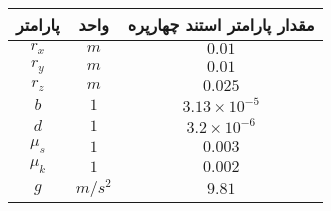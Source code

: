 \begin{table}[H]
	\begin{center}
		\begin{tabular}{ c c c }
			\hline
			پارامتر & واحد & مقدار پارامتر استند چهارپره    \\
			\hline
			
$r_{x}$ & $m$& $0.01$    \\
$r_{y}$ & $m$& $0.01$    \\
$r_{z}$ & $m$& $0.025$    \\
$b$ &  $1$ &$3.13\times10^{-5}$   \\
$d$ & $1$&$3.2\times10^{-6}$   \\
$\mu_{s}$ & $1$& $0.003$    \\
$\mu_{k}$ & $1$& $0.002$    \\
$g$&$m/s^2$&$9.81$\\
			
			\hline
		\end{tabular}
	\end{center}
\end{table}



